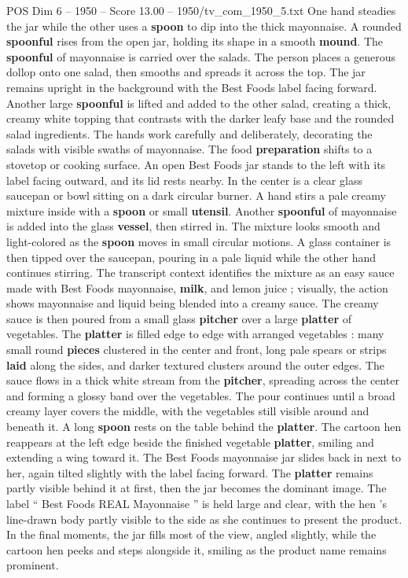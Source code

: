 \begin{textsample}{POS Dim 6 – 1950 – Score 13.00 – 1950/tv\_com\_1950\_5.txt}
One hand steadies the jar while the other uses a \textbf{spoon} to dip into the thick mayonnaise.
A rounded \textbf{spoonful} rises from the open jar, holding its shape in a smooth \textbf{mound}.
The \textbf{spoonful} of mayonnaise is carried over the salads.
The person places a generous dollop onto one salad, then smooths and spreads it across the top.
The jar remains upright in the background with the Best Foods label facing forward.
Another large \textbf{spoonful} is lifted and added to the other salad, creating a thick, creamy white topping that contrasts with the darker leafy base and the rounded salad ingredients.
The hands work carefully and deliberately, decorating the salads with visible swaths of mayonnaise.
The food \textbf{preparation} shifts to a stovetop or cooking surface.
An open Best Foods jar stands to the left with its label facing outward, and its lid rests nearby.
In the center is a clear glass saucepan or bowl sitting on a dark circular burner.
A hand stirs a pale creamy mixture inside with a \textbf{spoon} or small \textbf{utensil}.
Another \textbf{spoonful} of mayonnaise is added into the glass \textbf{vessel}, then stirred in.
The mixture looks smooth and light-colored as the \textbf{spoon} moves in small circular motions.
A glass container is then tipped over the saucepan, pouring in a pale liquid while the other hand continues stirring.
The transcript context identifies the mixture as an easy sauce made with Best Foods mayonnaise, \textbf{milk}, and lemon juice ; visually, the action shows mayonnaise and liquid being blended into a creamy sauce.
The creamy sauce is then poured from a small glass \textbf{pitcher} over a large \textbf{platter} of vegetables.
The \textbf{platter} is filled edge to edge with arranged vegetables : many small round \textbf{pieces} clustered in the center and front, long pale spears or strips \textbf{laid} along the sides, and darker textured clusters around the outer edges.
The sauce flows in a thick white stream from the \textbf{pitcher}, spreading across the center and forming a glossy band over the vegetables.
The pour continues until a broad creamy layer covers the middle, with the vegetables still visible around and beneath it.
A long \textbf{spoon} rests on the table behind the \textbf{platter}.
The cartoon hen reappears at the left edge beside the finished vegetable \textbf{platter}, smiling and extending a wing toward it.
The Best Foods mayonnaise jar slides back in next to her, again tilted slightly with the label facing forward.
The \textbf{platter} remains partly visible behind it at first, then the jar becomes the dominant image.
The label “ Best Foods REAL Mayonnaise ” is held large and clear, with the hen ’s line-drawn body partly visible to the side as she continues to present the product.
In the final moments, the jar fills most of the view, angled slightly, while the cartoon hen peeks and steps alongside it, smiling as the product name remains prominent.

\end{textsample}
